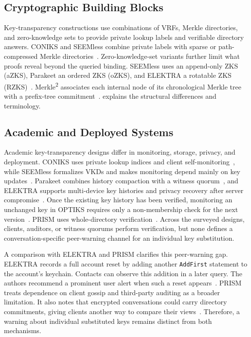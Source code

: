 \subsection{Cryptographic Building Blocks}\label{ssec:bg-vkd-blocks}

Key-transparency constructions use combinations of VRFs, Merkle directories, and zero-knowledge
sets to provide private lookup labels and verifiable directory answers. CONIKS and SEEMless combine
private labels with sparse or path-compressed Merkle
directories~\cite{melara2015coniks,chase2019seemless}. Zero-knowledge-set variants further limit
what proofs reveal beyond the queried binding. SEEMless uses an append-only ZKS (aZKS), Parakeet an
ordered ZKS (oZKS), and ELEKTRA a rotatable ZKS
(RZKS)~\cite{chase2019seemless,malvai2023parakeet,len2023elektra,chen2022rzks}.
Merkle\textsuperscript{2} associates each internal node of its chronological Merkle tree with a
prefix-tree commitment~\cite{hu2021merkle2}.
 explains the structural differences and terminology.

\subsection{Academic and Deployed Systems}\label{ssec:bg-vkd-academic}

Academic key-transparency designs differ in monitoring, storage, privacy, and deployment. CONIKS
uses private lookup indices and client
self-monitoring~\cite{melara2015coniks}, while SEEMless formalizes VKDs and
makes monitoring depend mainly on key
updates~\cite[Sections~1--2 and 4.2]{chase2019seemless}. Parakeet combines history compaction with a
witness quorum~\cite[Sections~IV--V]{malvai2023parakeet}, and ELEKTRA supports multi-device key
histories and privacy recovery after server
compromise~\cite[Sections~1, 2.1, and 3.1]{len2023elektra}. Once the existing key history has been
verified, monitoring an unchanged key in OPTIKS requires only a non-membership check for the next
version~\cite[Section~5]{optiks2024}. PRISM uses
whole-directory verification~\cite[Sections~1 and 4]{pusch2025prism}. Across the surveyed designs,
clients, auditors, or witness quorums perform verification, but none defines a conversation-specific
peer-warning channel for an individual key substitution.

A comparison with ELEKTRA and PRISM clarifies this peer-warning gap. ELEKTRA records a full account
reset by adding another \texttt{AddFirst} statement to the account's keychain. Contacts can observe
this addition in a later query. The authors recommend a prominent user alert when such a reset
appears~\cite[Section~2.2]{len2023elektra}. PRISM treats dependence on client gossip and third-party
auditing as a broader limitation. It also notes that encrypted conversations could carry directory
commitments, giving clients another way to compare their views~\cite{pusch2025prism}. Therefore, a warning about individual
substituted keys remains distinct from both mechanisms.

